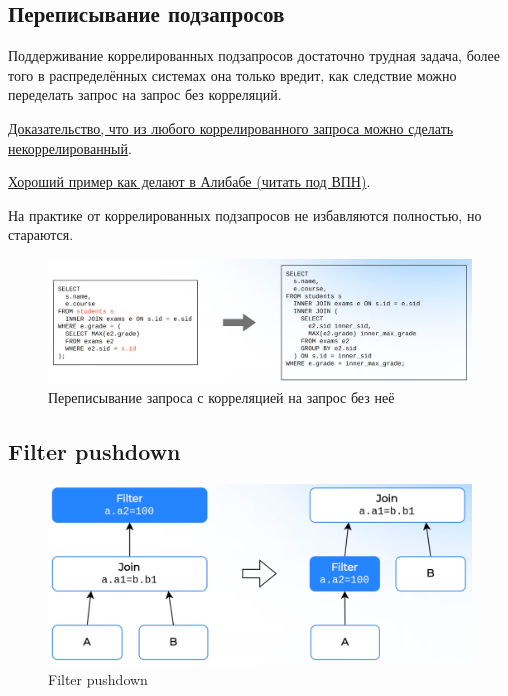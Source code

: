 \documentclass[11pt]{article}
\begin{document}
    \newpage

    \subsection{Переписывание подзапросов}

    Поддерживание коррелированных подзапросов достаточно трудная задача, более того в распределённых системах она только вредит, как следствие можно переделать запрос на запрос без корреляций.

    \href{https://cs.emis.de/LNI/Proceedings/Proceedings241/383.pdf}{Доказательство, что из любого коррелированного запроса можно сделать некоррелированный}.

    \href{https://alibaba-cloud.medium.com/query-optimization-technology-for-correlated-subqueries-8d265a51f58e}{Хороший пример как делают в Алибабе (читать под ВПН)}.

    На практике от коррелированных подзапросов не избавляются полностью, но стараются.

    \begin{figure}[h!]
        \centering
        \includegraphics[width=\textwidth]{Pictures/Ключевые оптимизации/Переписывание подзапросов}
        \caption{Переписывание запроса с корреляцией на запрос без неё}
    \end{figure}

    \subsection{Filter pushdown}

    \begin{figure}[h!]
        \centering
        \includegraphics[width=\textwidth]{Pictures/Ключевые оптимизации/Filter pushdown}
        \caption{Filter pushdown}
    \end{figure}
\end{document}
